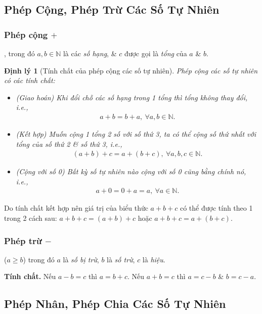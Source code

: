 \documentclass{article}
\numberwithin{equation}{section}
\newtheorem{theorem}{Định lý}[section]
\begin{document}
\subsection{Phép Cộng, Phép Trừ Các Số Tự Nhiên}

\subsubsection{Phép cộng $+$}
, trong đó $a,b\in\mathbb{N}$ là các \textit{số hạng}, \& $c$ được gọi là \textit{tổng} của $a$ \& $b$.

\begin{theorem}[Tính chất của phép cộng các số tự nhiên]
	Phép cộng các số tự nhiên có các tính chất:
	\begin{itemize}
		\item (Giao hoán) Khi đổi chỗ các số hạng trong 1 tổng thì tổng không thay đổi, i.e.,
		\begin{align*}
			a + b = b + a,\ \forall a,b\in\mathbb{N}.
		\end{align*}
		\item (Kết hợp) Muốn cộng 1 tổng 2 số với số thứ 3, ta có thể cộng số thứ nhất với tổng của số thứ 2 \& số thứ 3, i.e.,
		\begin{align*}
			(a + b) + c = a +(b + c),\ \forall a,b,c\in\mathbb{N}.
		\end{align*}
		\item (Cộng với số 0) Bất kỳ số tự nhiên nào cộng với số 0 cũng bằng chính nó, i.e.,
		\begin{align*}
			a + 0 = 0 + a = a,\ \forall a\in\mathbb{N}.
		\end{align*}
	\end{itemize}
\end{theorem}
Do tính chất kết hợp nên giá trị của biểu thức $a + b + c$ có thể được tính theo 1 trong 2 cách sau: $a + b + c = (a + b) + c$ hoặc $a + b + c = a + (b + c)$.

\subsubsection{Phép trừ $-$}
 ($a\ge b$) trong đó $a$ là \textit{số bị trừ}, $b$ là \textit{số trừ}, $c$ là \textit{hiệu}.

\noindent\textbf{Tính chất.} Nếu $a - b = c$ thì $a = b + c$. Nếu $a + b = c$ thì $a = c - b$ \& $b = c - a$.

\subsection{Phép Nhân, Phép Chia Các Số Tự Nhiên}
\end{document}

